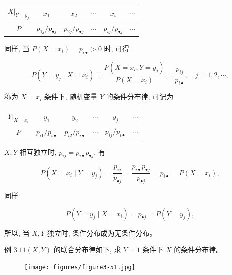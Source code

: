 \documentclass{beamer}
\begin{document}
	\begin{frame}
		\begin{tabular}{c | c c c c c}
			$\left.X\right|_{Y=y_{j}}$ & $x_{1}$ & $x_{2}$ & $\cdots$ & $x_{i}$ & $\cdots$ \\
			\hline
			$P$ & $p_{1 j} / p_{\bullet j}$ & $p_{2 j} / p_{\bullet j}$ & $\cdots$ & $p_{i j} / p_{\bullet j}$ & $\cdots$ \\
		\end{tabular}
		
		同样, 当 $P\left(X=x_{i}\right)=p_{i \bullet}>0$ 时, 可得
		
		$$
		P\left(Y=y_{j} \mid X=x_{i}\right)=\frac{P\left(X=x_{i}, Y=y_{j}\right)}{P\left(X=x_{i}\right)}=\frac{p_{i j}}{p_{i \bullet}}, \quad j=1,2, \cdots,
		$$
		
		称为 $X=x_{i}$ 条件下, 随机变量 $Y$ 的条件分布律, 可记为
		\begin{tabular}{c|ccccc}
			$\left.Y\right|_{X=x_{i}}$ & $y_{1}$ & $y_{2}$ & $\cdots$ & $y_{j}$ & $\cdots$ \\
			\hline
			$P$ & $p_{i 1} / p_{i \bullet}$ & $p_{i 2} / p_{i \bullet}$ & $\cdots$ & $p_{i j} / p_{i \bullet}$ & $\cdots$ \\
		\end{tabular}
	\end{frame}
	
	\begin{frame}
		 $X, Y$ 相互独立时, $p_{i j}=p_{i \bullet} p_{\bullet j}$, 有
		
		$$
		P\left(X=x_{i} \mid Y=y_{j}\right)=\frac{p_{i j}}{p_{\bullet j}}=\frac{p_{i \bullet} p_{\bullet j}}{p_{\bullet j}}=p_{i \bullet}=P\left(X=x_{i}\right),
		$$
		
		同样
		
		$$
		P\left(Y=y_{j} \mid X=x_{i}\right)=p_{\bullet j}=P\left(Y=y_{j}\right),
		$$
		
		所以, 当 $X, Y$ 独立时, 条件分布成为无条件分布。
	\end{frame}
	
	\begin{frame}
		例 $3.11(X, Y)$ 的联合分布律如下, 求 $Y=1$ 条件下 $X$ 的条件分布律。
		\begin{figure}
			\centering
			\texttt{[image: figures/figure3-51.jpg]}
		\end{figure}
	\end{frame}
	
\end{document}
